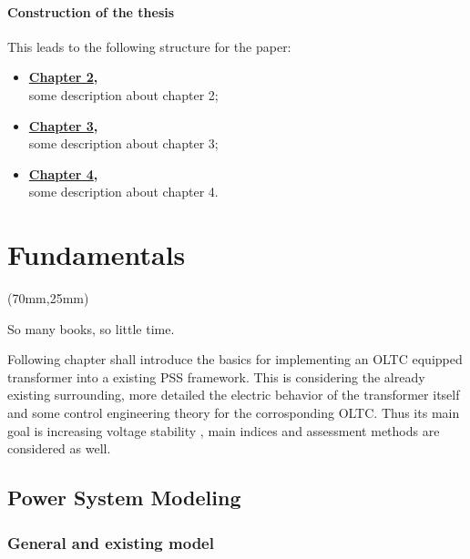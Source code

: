 \subsubsection{Construction of the thesis}

This leads to the following structure for the paper: 
\begin{itemize}
    \item \textbf{\hyperref[chap:fundamentals]{Chapter 2},}\\
    some description about chapter 2;
    \item \textbf{\hyperref[chap:methods]{Chapter 3},}\\
    some description about chapter 3;
    \item \textbf{\hyperref[chap:results]{Chapter 4},}\\
    some description about chapter 4.
\end{itemize}

\chapter{Fundamentals}
\label{ch:fundamentals}

\begin{textblock*}{.7\textwidth}(70mm,25mm)
    \begin{fquote}
        So many books, so little time.
    \end{fquote}
\end{textblock*}

Following chapter shall introduce the basics for implementing an \acs{OLTC} equipped transformer into a existing \acs{PSS} framework. This is considering the already existing surrounding, more detailed the electric behavior of the transformer itself and some control engineering theory for the corrosponding \acs{OLTC}. Thus its main goal is increasing voltage stability \autocite{machowskiPowerSystemDynamics2020}, main indices and assessment methods are considered as well.

\section{Power System Modeling}

\subsection{General and existing model}

